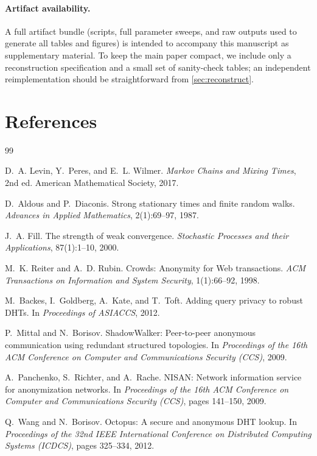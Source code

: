\documentclass[11pt]{article}
\begin{document}
\paragraph{Artifact availability.}
A full artifact bundle (scripts, full parameter sweeps, and raw outputs used to generate all tables and figures)
is intended to accompany this manuscript as supplementary material. To keep the main paper compact,
we include only a reconstruction specification and a small set of sanity-check tables; an independent
reimplementation should be straightforward from \cref{sec:reconstruct}.


\section*{References}
\begin{thebibliography}{99}\small

D.~A. Levin, Y.~Peres, and E.~L. Wilmer.
\newblock \emph{Markov Chains and Mixing Times}, 2nd ed.
\newblock American Mathematical Society, 2017.

D.~Aldous and P.~Diaconis.
\newblock Strong stationary times and finite random walks.
\newblock \emph{Advances in Applied Mathematics}, 2(1):69--97, 1987.

J.~A. Fill.
\newblock The strength of weak convergence.
\newblock \emph{Stochastic Processes and their Applications}, 87(1):1--10, 2000.

M.~K. Reiter and A.~D. Rubin.
\newblock Crowds: Anonymity for {W}eb transactions.
\newblock \emph{ACM Transactions on Information and System Security}, 1(1):66--92, 1998.

M.~Backes, I.~Goldberg, A.~Kate, and T.~Toft.
\newblock Adding query privacy to robust {DHT}s.
\newblock In \emph{Proceedings of ASIACCS}, 2012.



P.~Mittal and N.~Borisov.
\newblock ShadowWalker: Peer-to-peer anonymous communication using redundant structured topologies.
\newblock In \emph{Proceedings of the 16th ACM Conference on Computer and Communications Security (CCS)}, 2009.

A.~Panchenko, S.~Richter, and A.~Rache.
\newblock NISAN: Network information service for anonymization networks.
\newblock In \emph{Proceedings of the 16th ACM Conference on Computer and Communications Security (CCS)}, pages 141--150, 2009.

Q.~Wang and N.~Borisov.
\newblock Octopus: A secure and anonymous DHT lookup.
\newblock In \emph{Proceedings of the 32nd IEEE International Conference on Distributed Computing Systems (ICDCS)}, pages 325--334, 2012.
\end{thebibliography}
\end{document}
